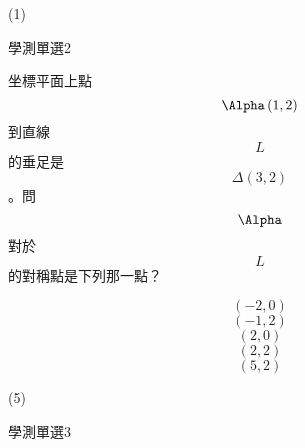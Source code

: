 \begin{QUESTIONS}
\begin{QUESTION}
\begin{QBODY}
        \end{QBODY}
        \begin{QFROMS}
        \end{QFROMS}
        \begin{QTAGS}\end{QTAGS}
        \begin{QANS}
            (1)
        \end{QANS}
        \begin{QSOLLIST}
        \end{QSOLLIST}
        \begin{QEMPTYSPACE}
        \end{QEMPTYSPACE}
    \end{QUESTION}
    \begin{QUESTION}
        \begin{ExamInfo}{85}{學測}{單選}{2}
        \end{ExamInfo}
        \begin{ExamAnsRateInfo}{}{}{}{}
        \end{ExamAnsRateInfo}
        \begin{QBODY}
            坐標平面上點\[\Alpha \left( 1,2 \right)\]到直線\[L\]的垂足是\[\Delta \left( 3,2 \right)\]。問\[\Alpha \]對於\[L\]的對稱點是下列那一點？
            \begin{QOPS} 
            \QOP\[\left( -2,0 \right)\]	
            \QOP\[\left( -1,2 \right)\]
            \QOP\[\left( 2,0 \right)\]
            \QOP\[\left( 2,2 \right)\]	
            \QOP\[\left( 5,2 \right)\]
            \end{QOPS}            
        \end{QBODY}
        \begin{QFROMS}
        \end{QFROMS}
        \begin{QTAGS}\end{QTAGS}
        \begin{QANS}
            (5)
        \end{QANS}
        \begin{QSOLLIST}
        \end{QSOLLIST}
        \begin{QEMPTYSPACE}
        \end{QEMPTYSPACE}
    \end{QUESTION}
    \begin{QUESTION}
        \begin{ExamInfo}{85}{學測}{單選}{3}
        \end{ExamInfo}

\end{QUESTION}
\end{QUESTIONS}
